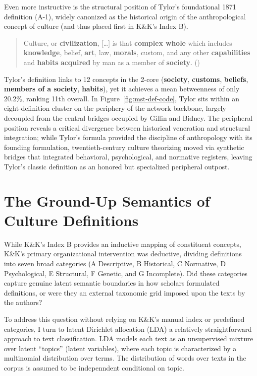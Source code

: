 \documentclass[11pt]{article}
\begin{document}
Even more instructive is the structural position of Tylor's foundational 1871 definition (A-1), widely canonized as the historical origin of the anthropological concept of culture (and thus placed first in K\&K's Index B).

\begin{quotation}
Culture, or \textbf{civilization}, [\ldots] is that \textbf{complex whole} which includes \textbf{knowledge}, belief, \textbf{art}, law, \textbf{morals}, custom, and any other \textbf{capabilities} and \textbf{habits} \textbf{acquired} by man as a member of \textbf{society}. (\citealt{tylor1871})
\end{quotation}

Tylor's definition links to 12 concepts in the 2-core (\textbf{society}, \textbf{customs}, \textbf{beliefs}, \textbf{members of a society}, \textbf{habits}), yet it achieves a mean betweenness of only 20.2\%, ranking 11th overall. In Figure~\ref{fig:mst-def-code}, Tylor sits within an eight-definition cluster on the periphery of the network backbone, largely decoupled from the central bridges occupied by Gillin and Bidney. The peripheral position reveals a critical divergence between historical veneration and structural integration; while Tylor's formula provided the discipline of anthropology with its founding formulation, twentieth-century culture theorizing moved via synthetic bridges that integrated behavioral, psychological, and normative registers, leaving Tylor's classic definition as an honored but specialized peripheral outpost.

\section{The Ground-Up Semantics of Culture Definitions}

While K\&K's Index B provides an inductive mapping of constituent concepts, K\&K's primary organizational intervention was deductive, dividing definitions into seven broad categories (A Descriptive, B Historical, C Normative, D Psychological, E Structural, F Genetic, and G Incomplete). Did these categories capture genuine latent semantic boundaries in how scholars formulated definitions, or were they an external taxonomic grid imposed upon the texts by the authors?

To address this question without relying on K\&K's manual index or predefined categories, I turn to latent Dirichlet allocation (LDA) \citep{blei2003latent} a relatively straightforward approach to text classification. LDA models each text as an unsupervised mixture over latent ``topics'' (latent variables), where each topic is characterized by a multinomial distribution over terms. The distribution of words over texts in the corpus is assumed to be indepenndent conditional on topic. 
\end{document}
